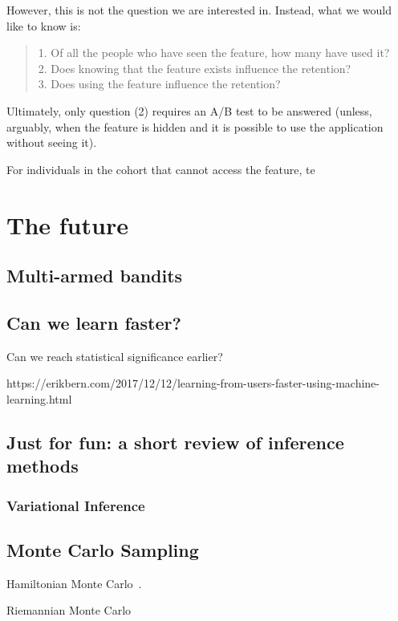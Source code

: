 \documentclass{tufte-book}
\begin{document}
However, this is not the question we are interested in. Instead, what we would
like to know is:

\begin{quotation}
    1. Of all the people who have seen the feature, how many have used it?\\
    2. Does knowing that the feature exists influence the retention?\\
    3. Does using the feature influence the retention?
\end{quotation}

Ultimately, only question (2) requires an A/B test to be answered (unless,
arguably, when the feature is hidden and it is possible to use the application
without seeing it).

For individuals in the cohort that cannot access the feature, te

\chapter{The future}
\section{Multi-armed bandits}

\section{Can we learn faster?}

Can we reach statistical significance earlier?

https://erikbern.com/2017/12/12/learning-from-users-faster-using-machine-learning.html

\section{Just for fun: a short review of inference methods}

\subsection{Variational Inference}

\section{Monte Carlo Sampling}


Hamiltonian Monte Carlo~\cite{Betancourt2017}.

Riemannian Monte Carlo~\cite{Betancourt2013}


\mainmatter








\backmatter




\printindex
\end{document}
